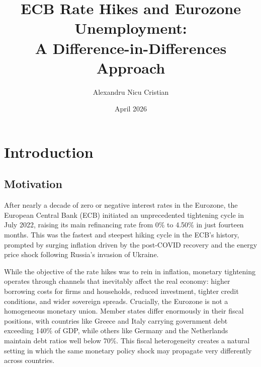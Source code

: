 \documentclass[12pt,a4paper]{article}
\title{\textbf{ECB Rate Hikes and Eurozone Unemployment:\\
A Difference-in-Differences Approach}}
\author{Alexandru Nicu Cristian}
\date{April 2026}
\begin{document}
\maketitle
\tableofcontents
\newpage

\section{Introduction}

\subsection{Motivation}

After nearly a decade of zero or negative interest rates in the Eurozone, the European Central Bank (ECB) initiated an unprecedented tightening cycle in July 2022, raising its main refinancing rate from 0\% to 4.50\% in just fourteen months. This was the fastest and steepest hiking cycle in the ECB's history, prompted by surging inflation driven by the post-COVID recovery and the energy price shock following Russia's invasion of Ukraine.

While the objective of the rate hikes was to rein in inflation, monetary tightening operates through channels that inevitably affect the real economy: higher borrowing costs for firms and households, reduced investment, tighter credit conditions, and wider sovereign spreads. Crucially, the Eurozone is not a homogeneous monetary union. Member states differ enormously in their fiscal positions, with countries like Greece and Italy carrying government debt exceeding 140\% of GDP, while others like Germany and the Netherlands maintain debt ratios well below 70\%. This fiscal heterogeneity creates a natural setting in which the same monetary policy shock may propagate very differently across countries.
\end{document}
